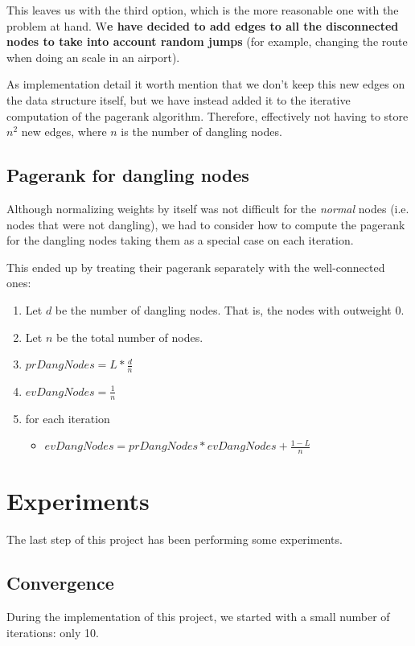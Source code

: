 \documentclass[10pt, a4paper]{article}
\begin{document}
This leaves us with the third option, which is the more reasonable one  with the problem at hand.  W\textbf{e have decided to add edges to all the disconnected nodes to take into account random jumps} (for example, changing the route when doing an scale in an airport). 

As implementation detail it worth mention that we don't keep this new edges on the data structure itself, but we have instead added it to the iterative computation of the pagerank algorithm. Therefore, effectively not having to store  $n^2$ new edges, where $n$ is the number of dangling nodes.

\subsection{Pagerank for dangling nodes}
Although normalizing weights by itself was not difficult for the \textit{normal} nodes (i.e. nodes that were not dangling), we had to consider how to compute the pagerank for the dangling nodes taking them as a special case on each iteration.

\noindent This ended up by treating their pagerank separately with the well-connected ones:
\begin{enumerate}
    \item Let $d$ be the number of dangling nodes. That is, the nodes with outweight 0.
    \item Let $n$ be the total number of nodes.
    \item $prDangNodes = L * \frac{d}{n}$
    \item $evDangNodes = \frac{1}{n}$
    \item for each iteration
    \begin{itemize}
        \item $evDangNodes = prDangNodes * evDangNodes + \frac{1 - L}{n}$
    \end{itemize}
\end{enumerate}


\section{Experiments}
The last step of this project has been performing some experiments.

\subsection{Convergence}
During the implementation of this project, we started with a small number of iterations: only 10.
\end{document}
